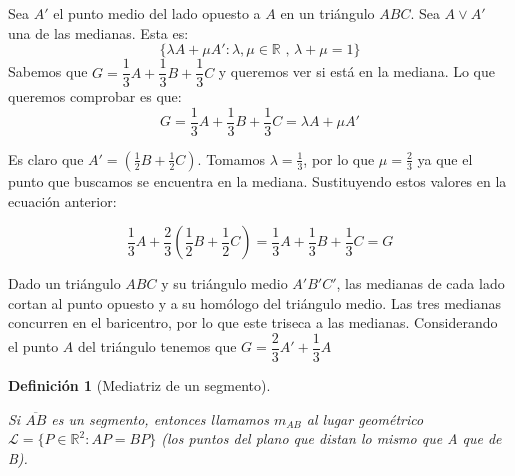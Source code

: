 \documentclass[11pt, a4paper]{article}
\makeatletter
\newif\IfInSansMode
\let\oldsf\sffamily
\renewcommand*{\sffamily}{\oldsf\mathversion{sans}\InSansModetrue}
\let\oldnorm\normalfont
\renewcommand*{\normalfont}{\oldnorm\InSansModefalse\mathversion{normal}}
\renewenvironment{proof}[1][\proofname] {\vspace{-15pt}\par\pushQED{\qed}\normalfont\topsep6\p@\@plus6\p@\relax\trivlist\item[\hskip\labelsep\it#1\@addpunct{.}]\ignorespaces}{\popQED\endtrivlist\@endpefalse}
\newcommand{\R}{\mathbb{R}}
\renewenvironment{proof}[1][\proofname] {\par\pushQED{\qed}\normalfont\topsep6\p@\@plus6\p@\relax\trivlist\item[\hskip\labelsep\itshape\sffamily#1\@addpunct{.}]\ignorespaces}{\popQED\endtrivlist\@endpefalse}
\theoremstyle{theorem-style}
\theoremstyle{definition-style}
\newtheorem{ndef}{Definición}[section]
\theoremstyle{remark-style}
\theoremstyle{example-style}
\makeatother
\begin{document}
\begin{proof}
  Sea $A'$ el punto medio del lado opuesto a $A$ en un triángulo $ABC$. Sea $A \vee A'$ una de las medianas. Esta es:
  \[
    \{\lambda A + \mu A': \lambda, \mu \in \R \text{ , } \lambda+\mu = 1\}
  \]
  Sabemos que $G = \dfrac{1}{3} A +  \dfrac{1}{3} B +  \dfrac{1}{3} C$ y queremos ver si está en la mediana. Lo que queremos comprobar es que:
  \[
    G = \dfrac{1}{3} A +  \dfrac{1}{3} B +  \dfrac{1}{3} C = \lambda A + \mu A'  
  \]
  
  Es claro que $A' = \left(\frac{1}{2}B + \frac{1}{2}C\right)$. Tomamos $\lambda = \frac{1}{3}$, por lo que $\mu = \frac{2}{3}$ ya que el punto que buscamos se encuentra en la mediana. Sustituyendo estos valores en la ecuación anterior:
  
  $$\dfrac{1}{3}A + \dfrac{2}{3}\left(\dfrac{1}{2}B+\dfrac{1}{2}C\right) = \frac{1}{3}A + \frac{1}{3}B + \frac{1}{3}C = G$$
\end{proof}

Dado un triángulo $ABC$ y su triángulo medio $A'B'C'$, las medianas de cada lado cortan al punto opuesto y a su homólogo del triángulo medio. Las tres medianas concurren en el baricentro, por lo que este triseca a las medianas. Considerando el punto $A$ del triángulo tenemos que $G = \dfrac{2}{3}A' + \dfrac{1}{3}A$

\begin{ndef}[Mediatriz de un segmento] \hfill\\
\begin{minipage}[c]{0.70\textwidth}
  Si $\overline{AB}$ es un segmento, entonces llamamos $m_{AB}$  al lugar geométrico $\mathcal{L}=\{P \in \R^2 : AP = BP\}$ (los puntos del plano que distan lo mismo que A que de B).
\end{minipage}
\begin{minipage}[]{0.27\textwidth}
  \begin{center}
  \sffamily
\end{center}
\end{minipage}
\end{ndef}
\end{document}
